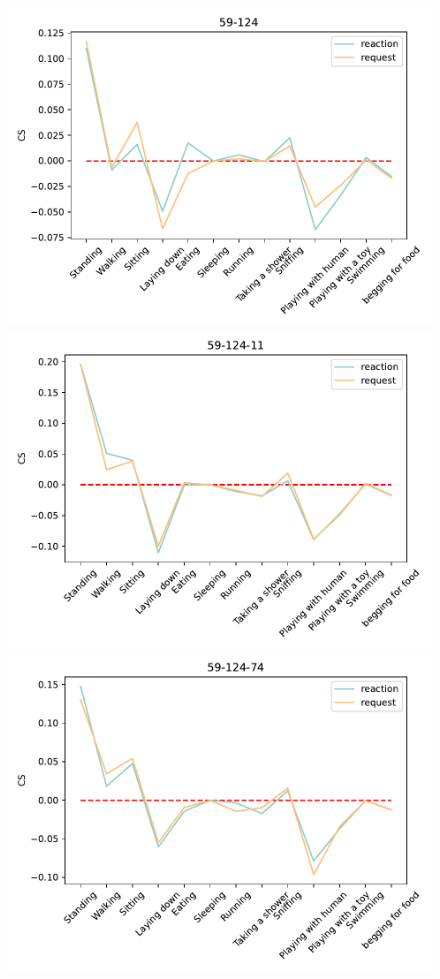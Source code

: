 \begin{figure}[ht]
		\begin{minipage}[b]{.3\linewidth}
			\centering
			\includegraphics[width=0.99\linewidth]{./35word/59-124.pdf}
		\end{minipage}
		\begin{minipage}[b]{.3\linewidth}
			\centering
			\includegraphics[width=0.99\linewidth]{./35word/59-124-11.pdf}
		\end{minipage}
		\begin{minipage}[b]{.3\linewidth}
			\centering
			\includegraphics[width=0.99\linewidth]{./35word/59-124-74.pdf}

\end{minipage}
\end{figure}
